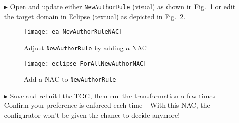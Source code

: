 \begin{itemize}

\item[$\blacktriangleright$] Open and update either \texttt{NewAuthorRule} (visual) as shown in Fig.~\ref{ea:existingAuthorNAC} or edit the target domain in 
Eclipse (textual) as depicted in Fig.~\ref{eclipse:existingAuthorNAC}.

\begin{figure}[htbp]
\begin{center}
  \texttt{[image: ea\_NewAuthorRuleNAC]}
  \caption{Adjust \texttt{NewAuthorRule} by adding a NAC}
  \label{ea:existingAuthorNAC}
\end{center}
\end{figure}

\vspace{0.5cm}

\begin{figure}[htbp]
\begin{center}
  \texttt{[image: eclipse\_ForAllNewAuthorNAC]}
  \caption{Add a NAC to \texttt{NewAuthorRule}}
  \label{eclipse:existingAuthorNAC}
\end{center}
\end{figure}

\vspace{0.5cm}

\item[$\blacktriangleright$] Save and rebuild the TGG, then run the transformation a few times. Confirm your preference is enforced each time -- With this NAC,
the configurator won't be given the chance to decide anymore!

\end{itemize}
